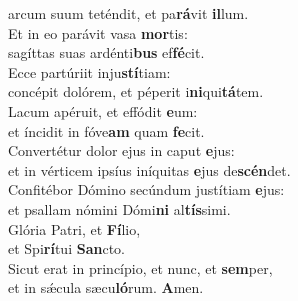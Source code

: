 \oddverse arcum suum teténdit, et pa\textbf{rá}vit \textbf{il}lum.\\
\evenverse Et in eo parávit vasa \textbf{mor}tis:~\*\\
\evenverse sagíttas suas ardénti\textbf{bus} ef\textbf{fé}cit.\\
\oddverse Ecce partúriit inju\textbf{stí}tiam:~\*\\
\oddverse concépit dolórem, et péperit i\textbf{ni}qui\textbf{tá}tem.\\
\evenverse Lacum apéruit, et effódit \textbf{e}um:~\*\\
\evenverse et íncidit in fóve\textbf{am} quam \textbf{fe}cit.\\
\oddverse Convertétur dolor ejus in caput \textbf{e}jus:~\*\\
\oddverse et in vérticem ipsíus iníquitas \textbf{e}jus de\textbf{scén}det.\\
\evenverse Confitébor Dómino secúndum justítiam \textbf{e}jus:~\*\\
\evenverse et psallam nómini Dómi\textbf{ni} al\textbf{tís}simi.\\
\oddverse Glória Patri, et \textbf{Fí}lio,~\*\\
\oddverse et Spi\textbf{rí}tui \textbf{San}cto.\\
\evenverse Sicut erat in princípio, et nunc, et \textbf{sem}per,~\*\\
\evenverse et in sǽcula sæcu\textbf{ló}rum. \textbf{A}men.\\
